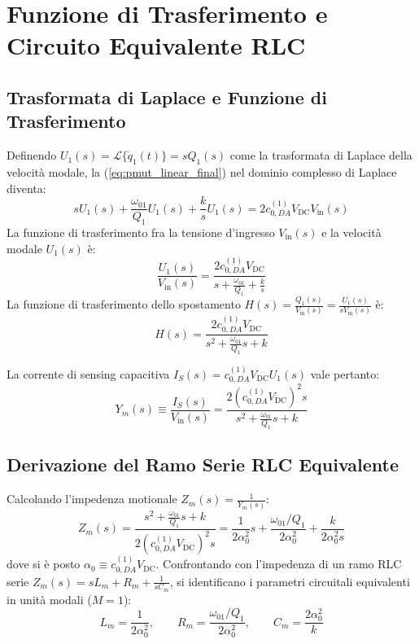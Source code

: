 \documentclass[11pt,a4paper]{article}
\begin{document}
\section{Funzione di Trasferimento e Circuito Equivalente RLC}

\subsection{Trasformata di Laplace e Funzione di Trasferimento}
Definendo $U_1(s) = \mathcal{L}\{\dot{q}_1(t)\} = s Q_1(s)$ come la trasformata di Laplace della velocità modale, la (\ref{eq:pmut_linear_final}) nel dominio complesso di Laplace diventa:
\begin{equation}
    s U_1(s) + \frac{\omega_{01}}{Q_1} U_1(s) + \frac{k}{s} U_1(s) = 2 c_{0,DA}^{(1)} V_{\text{DC}} V_{\text{in}}(s)
\end{equation}
La funzione di trasferimento fra la tensione d'ingresso $V_{\text{in}}(s)$ e la velocità modale $U_1(s)$ è:
\begin{equation}
    \frac{U_1(s)}{V_{\text{in}}(s)} = \frac{2 c_{0,DA}^{(1)} V_{\text{DC}}}{s + \frac{\omega_{01}}{Q_1} + \frac{k}{s}}
    \label{eq:tf_velocity}
\end{equation}
La funzione di trasferimento dello spostamento $H(s) = \frac{Q_1(s)}{V_{\text{in}}(s)} = \frac{U_1(s)}{s V_{\text{in}}(s)}$ è:
\begin{equation}
    H(s) = \frac{2 c_{0,DA}^{(1)} V_{\text{DC}}}{s^2 + \frac{\omega_{01}}{Q_1} s + k}
\end{equation}

La corrente di sensing capacitiva $I_S(s) = c_{0,DA}^{(1)} V_{\text{DC}} U_1(s)$ vale pertanto:
\begin{equation}
    Y_m(s) \equiv \frac{I_S(s)}{V_{\text{in}}(s)} = \frac{2 \left( c_{0,DA}^{(1)} V_{\text{DC}} \right)^2 s}{s^2 + \frac{\omega_{01}}{Q_1} s + k}
    \label{eq:admittance_motional}
\end{equation}

\subsection{Derivazione del Ramo Serie RLC Equivalente}
Calcolando l'impedenza motionale $Z_m(s) = \frac{1}{Y_m(s)}$:
\begin{equation}
    Z_m(s) = \frac{s^2 + \frac{\omega_{01}}{Q_1} s + k}{2 \left( c_{0,DA}^{(1)} V_{\text{DC}} \right)^2 s} = \frac{1}{2 \alpha_0^2} s + \frac{\omega_{01} / Q_1}{2 \alpha_0^2} + \frac{k}{2 \alpha_0^2 s}
\end{equation}
dove si è posto $\alpha_0 \equiv c_{0,DA}^{(1)} V_{\text{DC}}$.
Confrontando con l'impedenza di un ramo RLC serie $Z_m(s) = s L_m + R_m + \frac{1}{s C_m}$, si identificano i parametri circuitali equivalenti in unità modali ($M=1$):
\begin{equation}
    \boxed{
    L_m = \frac{1}{2 \alpha_0^2}, \qquad R_m = \frac{\omega_{01} / Q_1}{2 \alpha_0^2}, \qquad C_m = \frac{2 \alpha_0^2}{k}
    }
    \label{eq:rlc_modal_formulas}
\end{equation}
\end{document}
